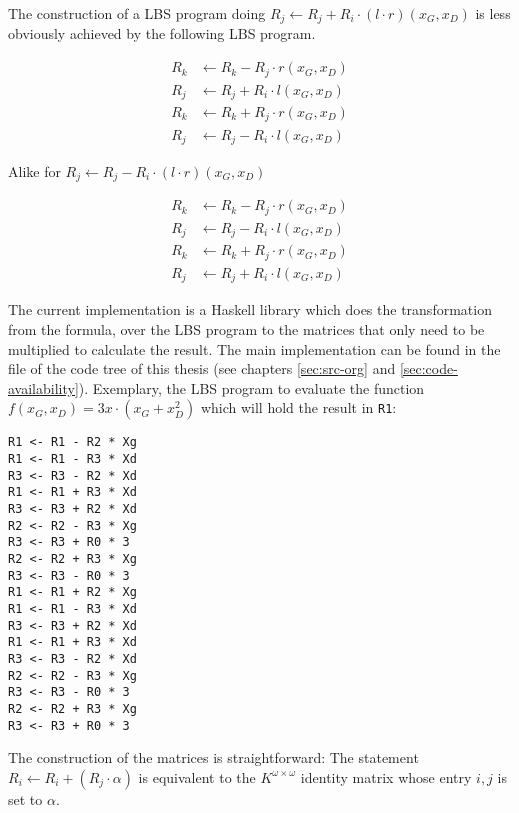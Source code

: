 The construction of a LBS program doing $R_j \leftarrow
R_j + R_i \cdot (l \cdot r)(x_G, x_D)$ is less obviously achieved by the
following LBS program.

\begin{align*}
R_k & \leftarrow R_k - R_j \cdot r(x_G, x_D) \\
R_j & \leftarrow R_j + R_i \cdot l(x_G, x_D) \\
R_k & \leftarrow R_k + R_j \cdot r(x_G, x_D) \\
R_j & \leftarrow R_j - R_i \cdot l(x_G, x_D)
\end{align*}

Alike for $R_j \leftarrow R_j - R_i \cdot (l \cdot r)(x_G, x_D)$

\begin{align*}
R_k & \leftarrow R_k - R_j \cdot r(x_G, x_D) \\
R_j & \leftarrow R_j - R_i \cdot l(x_G, x_D) \\
R_k & \leftarrow R_k + R_j \cdot r(x_G, x_D) \\
R_j & \leftarrow R_j + R_i \cdot l(x_G, x_D)
\end{align*}



The current implementation is a Haskell library which does the transformation
from the formula, over the LBS program to the matrices that only need to be
multiplied to calculate the result. The main implementation can be
found in the file  of the code tree of this thesis (see
chapters \ref{sec:src-org} and \ref{sec:code-availability}). Exemplary, the LBS
program to evaluate the function $f(x_G,x_D) = 3x \cdot (x_G + x_D^2)$ which
will hold the result in \texttt{R1}:

\begin{lstlisting}
R1 <- R1 - R2 * Xg
R1 <- R1 - R3 * Xd
R3 <- R3 - R2 * Xd
R1 <- R1 + R3 * Xd
R3 <- R3 + R2 * Xd
R2 <- R2 - R3 * Xg
R3 <- R3 + R0 * 3
R2 <- R2 + R3 * Xg
R3 <- R3 - R0 * 3
R1 <- R1 + R2 * Xg
R1 <- R1 - R3 * Xd
R3 <- R3 + R2 * Xd
R1 <- R1 + R3 * Xd
R3 <- R3 - R2 * Xd
R2 <- R2 - R3 * Xg
R3 <- R3 - R0 * 3
R2 <- R2 + R3 * Xg
R3 <- R3 + R0 * 3
\end{lstlisting}

\noindent{}The construction of the matrices is straightforward: The statement
$R_i \leftarrow R_i + (R_j \cdot \alpha)$ is equivalent to the $K^{\omega \times
\omega}$ identity matrix whose entry $i,j$ is set to $\alpha$.


